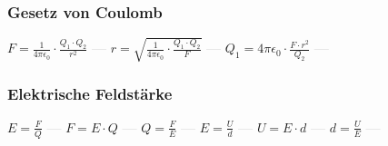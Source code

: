 \subsubsection{Gesetz von Coulomb} 
\begin{minipage}{0.45\textwidth} 
\end{minipage} 
\begin{minipage}{0.45\textwidth} 
 
\end{minipage} 
$ F = \frac{ 1}{4\pi \epsilon _{0} } \cdot  \frac{Q_{1} \cdot Q_{2} }{  r^{2} } $ \textcolor{lightgray}{\textbf{---}} 
$ r = \sqrt{\frac{  1}{4\pi \epsilon _{0} } \cdot  \frac{Q_{1} \cdot Q_{2} }{  F}} $ \textcolor{lightgray}{\textbf{---}} 
$ Q_{1}  = 4\pi \epsilon _{0}  \cdot  \frac{F\cdot r^{2} }{ Q_{2} } $ \textcolor{lightgray}{\textbf{---}} 

\subsubsection{Elektrische Feldstärke} 
\begin{minipage}{0.45\textwidth} 
\end{minipage} 
\begin{minipage}{0.45\textwidth} 
 
\end{minipage} 
$ E = \frac{F}{Q} $ \textcolor{lightgray}{\textbf{---}} 
$ F = E\cdot Q $ \textcolor{lightgray}{\textbf{---}} 
$ Q = \frac{F}{E} $ \textcolor{lightgray}{\textbf{---}} 
$ E = \frac{U}{d} $ \textcolor{lightgray}{\textbf{---}} 
$ U = E\cdot d $ \textcolor{lightgray}{\textbf{---}} 
$ d = \frac{U}{E} $ \textcolor{lightgray}{\textbf{---}} 

